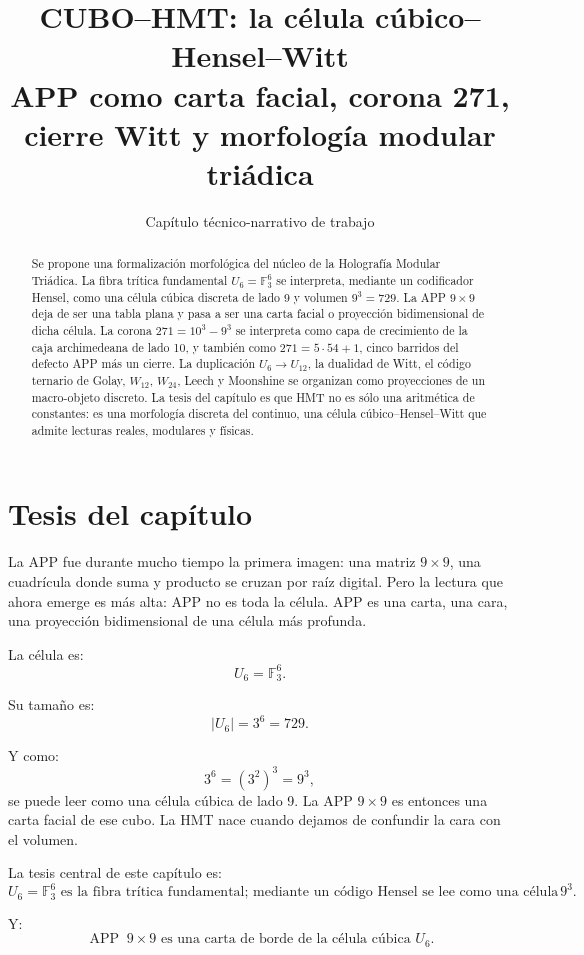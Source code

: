\documentclass[11pt,a4paper]{article}
\title{\bfseries CUBO--HMT: la célula cúbico--Hensel--Witt\\
\large APP como carta facial, corona 271, cierre Witt y morfología modular triádica}
\author{Capítulo técnico-narrativo de trabajo}
\date{}
\theoremstyle{definition}
\theoremstyle{remark}
\newcommand{\F}{\mathbb F}
\newcommand{\APP}{\operatorname{APP}}
\begin{document}
\maketitle

\begin{abstract}
Se propone una formalización morfológica del núcleo de la Holografía Modular Triádica. La fibra trítica fundamental \(U_6=\F_3^6\) se interpreta, mediante un codificador Hensel, como una célula cúbica discreta de lado 9 y volumen \(9^3=729\). La APP \(9\times9\) deja de ser una tabla plana y pasa a ser una carta facial o proyección bidimensional de dicha célula. La corona \(271=10^3-9^3\) se interpreta como capa de crecimiento de la caja archimedeana de lado 10, y también como \(271=5\cdot54+1\), cinco barridos del defecto APP más un cierre. La duplicación \(U_6\to U_{12}\), la dualidad de Witt, el código ternario de Golay, \(W_{12}\), \(W_{24}\), Leech y Moonshine se organizan como proyecciones de un macro-objeto discreto. La tesis del capítulo es que HMT no es sólo una aritmética de constantes: es una morfología discreta del continuo, una célula cúbico--Hensel--Witt que admite lecturas reales, modulares y físicas.
\end{abstract}

\tableofcontents

\section{Tesis del capítulo}

La APP fue durante mucho tiempo la primera imagen: una matriz \(9\times9\), una cuadrícula donde suma y producto se cruzan por raíz digital. Pero la lectura que ahora emerge es más alta: APP no es toda la célula. APP es una carta, una cara, una proyección bidimensional de una célula más profunda.

La célula es:
\[
U_6=\F_3^6.
\]

Su tamaño es:
\[
|U_6|=3^6=729.
\]

Y como:
\[
3^6=(3^2)^3=9^3,
\]
se puede leer como una célula cúbica de lado 9. La APP \(9\times9\) es entonces una carta facial de ese cubo. La HMT nace cuando dejamos de confundir la cara con el volumen.

La tesis central de este capítulo es:
\[
\boxed{
U_6=\F_3^6\text{ es la fibra trítica fundamental; mediante un código Hensel se lee como una célula cúbica }9^3.
}
\]

Y:
\[
\boxed{
\APP\;9\times9\text{ es una carta de borde de la célula cúbica }U_6.
}
\]
\end{document}
